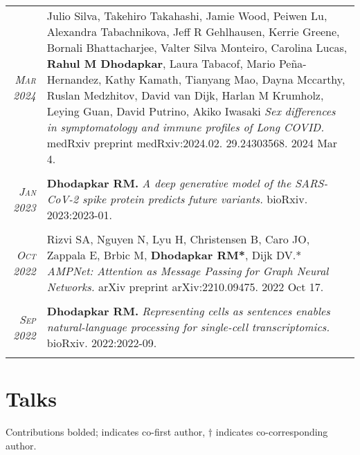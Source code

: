 \documentclass[a4paper,10pt]{article}
\begin{document}
\begin{tabular}{rp{11cm}}
 \textit{\textsc{Mar} 2024}& Julio Silva, Takehiro Takahashi, Jamie Wood, Peiwen Lu, Alexandra Tabachnikova, Jeff R Gehlhausen, Kerrie Greene, Bornali Bhattacharjee, Valter Silva Monteiro, Carolina Lucas, \textbf{Rahul M Dhodapkar}, Laura Tabacof, Mario Peña-Hernandez, Kathy Kamath, Tianyang Mao, Dayna Mccarthy, Ruslan Medzhitov, David van Dijk, Harlan M Krumholz, Leying Guan, David Putrino, Akiko Iwasaki {\it Sex differences in symptomatology and immune profiles of Long COVID.} medRxiv preprint medRxiv:2024.02. 29.24303568. 2024 Mar 4.
 \\
\multicolumn{2}{c}{} \\
 \textit{\textsc{Jan} 2023}& {\bf Dhodapkar RM.} {\it A deep generative model of the SARS-CoV-2 spike protein predicts future variants.} bioRxiv. 2023:2023-01. \\
\multicolumn{2}{c}{} \\
 \textit{\textsc{Oct} 2022}& Rizvi SA, Nguyen N, Lyu H, Christensen B, Caro JO, Zappala E, Brbic M, {\bf Dhodapkar RM*}, Dijk DV.* {\it AMPNet: Attention as Message Passing for Graph Neural Networks.} arXiv preprint arXiv:2210.09475. 2022 Oct 17.
 \\
\multicolumn{2}{c}{} \\
 \textit{\textsc{Sep} 2022}& {\bf Dhodapkar RM.} {\it Representing cells as sentences enables natural-language processing for single-cell transcriptomics.} bioRxiv. 2022:2022-09.
 \\
\multicolumn{2}{c}{}
\end{tabular}

\newpage
\section{Talks}
Contributions bolded; {\bf *} indicates co-first author, {\bf $\dag$} indicates co-corresponding author. 
\end{document}
